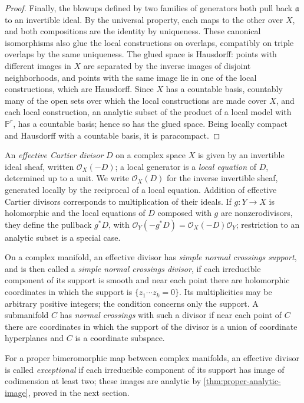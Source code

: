 \begin{proof}
Finally, the blowups defined by two families of generators both pull back $\mathfrak a$ to an invertible ideal. By the universal property, each maps to the other over $X$, and both compositions are the identity by uniqueness. These canonical isomorphisms also glue the local constructions on overlaps, compatibly on triple overlaps by the same uniqueness. The glued space is Hausdorff: points with different images in $X$ are separated by the inverse images of disjoint neighborhoods, and points with the same image lie in one of the local constructions, which are Hausdorff. Since $X$ has a countable basis, countably many of the open sets over which the local constructions are made cover $X$, and each local construction, an analytic subset of the product of a local model with $\mathbb P^r$, has a countable basis; hence so has the glued space. Being locally compact and Hausdorff with a countable basis, it is paracompact.
\end{proof}

An \emph{effective Cartier divisor} $D$ on a complex space $X$ is given by an invertible ideal sheaf, written $\mathcal O_X(-D)$; a local generator is a \emph{local equation} of $D$, determined up to a unit. We write $\mathcal O_X(D)$ for the inverse invertible sheaf, generated locally by the reciprocal of a local equation. Addition of effective Cartier divisors corresponds to multiplication of their ideals. If $g\colon Y\to X$ is holomorphic and the local equations of $D$ composed with $g$ are nonzerodivisors, they define the pullback $g^*D$, with $\mathcal O_Y(-g^*D)=\mathcal O_X(-D)\mathcal O_Y$; restriction to an analytic subset is a special case.

On a complex manifold, an effective divisor has \emph{simple normal crossings support}, and is then called a \emph{simple normal crossings divisor}, if each irreducible component of its support is smooth and near each point there are holomorphic coordinates in which the support is $\{z_1\cdots z_k=0\}$. Its multiplicities may be arbitrary positive integers; the condition concerns only the support. A submanifold $C$ has \emph{normal crossings} with such a divisor if near each point of $C$ there are coordinates in which the support of the divisor is a union of coordinate hyperplanes and $C$ is a coordinate subspace.

For a proper bimeromorphic map between complex manifolds, an effective divisor is called \emph{exceptional} if each irreducible component of its support has image of codimension at least two; these images are analytic by \cref{thm:proper-analytic-image}, proved in the next section.


